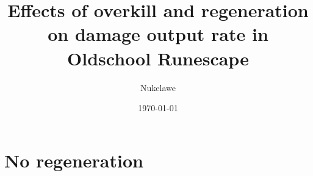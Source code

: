 

\title{Effects of overkill and regeneration on damage output rate in Oldschool Runescape}
\author{Nukelawe}
\date{\today}
\maketitle



\pagebreak
\section{No regeneration}\label{chap:noregen}


%




%
\pagebreak
\pagebreak


%


